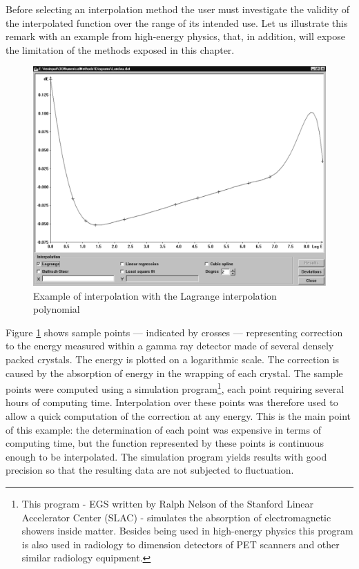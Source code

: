 \documentclass[twoside]{book}
\begin{document}
 Before selecting an interpolation method the
user must investigate the validity of the interpolated function
over the range of its intended use. Let us illustrate this remark
with an example from high-energy physics, that, in addition, will
expose the limitation of the methods exposed in this chapter.

\begin{figure}
\label{fig:landauinterpol}
\centering\includegraphics[width=12cm]{Figures/Lagrange}
\caption{Example of interpolation with the Lagrange interpolation
polynomial}
\end{figure}
Figure \ref{fig:landauinterpol} shows sample points --- indicated
by crosses --- representing correction to the energy measured
within a gamma ray detector made of several densely packed
crystals. The energy is plotted on a logarithmic scale. The
correction is caused by the absorption of energy in the wrapping
of each crystal. The sample points were computed using a
simulation program\footnote{This program - EGS written by Ralph
Nelson of the Stanford Linear Accelerator Center (SLAC) -
simulates the absorption of electromagnetic showers inside matter.
Besides being used in high-energy physics this program is also
used in radiology to dimension detectors of PET scanners and other
similar radiology equipment.}, each point requiring several hours
of computing time. Interpolation over these points was therefore
used to allow a quick computation of the correction at any energy.
This is the main point of this example: the determination of each
point was expensive in terms of computing time, but the function
represented by these points is continuous enough to be
interpolated. The simulation program yields results with good
precision so that the resulting data are not subjected to
fluctuation.
\end{document}
